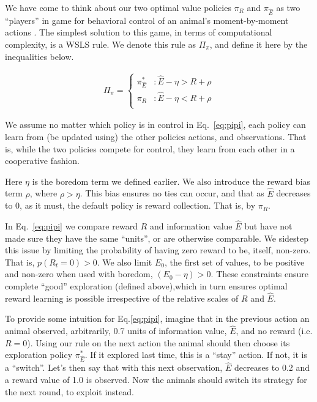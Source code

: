 We have come to think about our two optimal value policies $\pi_R$ and $\pi_{\hat E}$ as two ``players'' in game for behavioral control of an animal's moment-by-moment actions \cite{Estes1994TowardAS}. The simplest solution to this game, in terms of computational complexity, is a WSLS rule. We denote this rule as $\Pi_\pi$, and define it here by the inequalities below. 

\begin{equation} 
    \label{eq:pipi}
    \begin{split}
        \Pi_{\pi} = 
        \begin{cases}
            \pi^*_{\hat{E}} & : \hat{E} - \eta > R + \rho \\
            \pi_R 	& : \hat{E} - \eta < R + \rho \\
        \end{cases}
    \end{split}
\end{equation}

We assume no matter which policy is in control in Eq.~\ref{eq:pipi}, each policy can learn from (be updated using) the other policies actions, and observations. That is, while the two policies compete for control, they learn from each other in a cooperative fashion.

Here $\eta$ is the boredom term we defined earlier. We also introduce the reward bias term $\rho$, where $\rho > \eta$. This bias ensures no ties can occur, and that as $\hat E$ decreases to 0, as it must, the default policy is reward collection. That is, by $\pi_R$.

In Eq.~\ref{eq:pipi} we compare reward $R$ and information value $\hat E$ but have not made sure they have the same ``units'', or are otherwise comparable. We sidestep this issue by limiting the probability of having zero reward to be, itself, non-zero. That is, $p(R_t=0) > 0$. We also limit $E_0$, the first set of values, to be positive and non-zero when used with boredom, $(E_0 - \eta) > 0$. These constraints ensure complete ``good'' exploration (defined above),which in turn ensures optimal reward learning is possible irrespective of the relative scales of $R$ and $\hat E$.

To provide some intuition for Eq.\ref{eq:pipi}, imagine that in the previous action an animal observed, arbitrarily, 0.7 units of information value, $\hat E$, and no reward (i.e. $R = 0$). Using our rule on the next action the animal should then choose its exploration policy $\pi^*_{\hat{E}}$. If it explored last time, this is a ``stay'' action. If not, it is a ``switch''. Let's then say that with this next observation, $\hat E$ decreases to 0.2 and a reward value of 1.0 is observed. Now the animals should switch its strategy for the next round, to exploit instead. 


